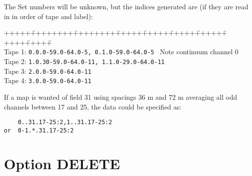 The Set numbers will be unknown, but the indices generated are (if they are
read in in order of tape and label): 

\vspace{-0.8cm}                                 %
\begin{tabbing} 
+++++\=++++++++\=++++++++\=+++++\=+++++\=+++++\=+++++\=+++++\=+++++\= \kill
 \\ \> Tape 1: \> {\tt 0.0.0-59.0-64.0-5, 0.1.0-59.0-64.0-5 } 
	\>\>\>\>\>Note continuum channel 0 
 \\ \> Tape 2: \> {\tt 1.0.30-59.0-64.0-11, 1.1.0-29.0-64.0-11 } 
 \\ \> Tape 3: \> {\tt 2.0.0-59.0-64.0-11 } 
 \\ \> Tape 4: \> {\tt 3.0.0-59.0-64.0-11 } 
\end{tabbing} 
\vspace{-0.4cm}                                 %

If a map is wanted of field 31 using spacings 36 m and 72 m averaging all odd
channels between 17 and 25, the data could be specified as: 

\begin{verbatim} 
    0..31.17-25:2,1..31.17-25:2
or  0-1.*.31.17-25:2 
\end{verbatim} 


\section{Option DELETE} 
\label{nscan.descr.delete} 
